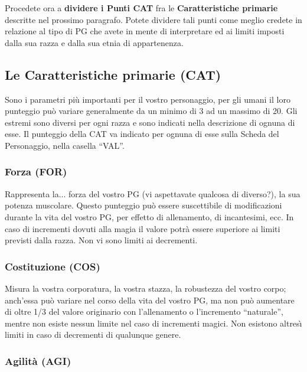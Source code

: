 Procedete ora a \textbf{dividere i Punti CAT} fra le
\textbf{Caratteristiche primarie} descritte nel prossimo paragrafo.
Potete dividere tali punti come meglio credete in relazione al tipo di
PG che avete in mente di interpretare ed ai limiti imposti dalla sua
razza e dalla sua etnia di appartenenza.

{\raggedright \subsection{Le Caratteristiche primarie (CAT)}}

Sono i parametri pi\`u importanti per il vostro personaggio, per gli
umani il loro punteggio pu\`o variare generalmente da un minimo di 3
ad un massimo di 20. Gli estremi sono diversi per ogni razza e sono
indicati nella descrizione di ognuna di esse.  Il punteggio della CAT
va indicato per ognuna di esse sulla Scheda del Personaggio, nella
casella ``VAL''.

\subsubsection{Forza (FOR)}

Rappresenta la... forza del vostro PG (vi aspettavate qualcosa di
diverso?), la sua potenza muscolare.  Questo punteggio pu\`o essere
suscettibile di modificazioni durante la vita del vostro PG, per
effetto di allenamento, di incantesimi, ecc. 
In caso di incrementi dovuti alla magia il valore potr\`a essere
superiore ai limiti previsti dalla razza. Non vi sono limiti ai
decrementi.


\subsubsection{Costituzione (COS)}

Misura la vostra corporatura, la vostra stazza, la robustezza del
vostro corpo; anch'essa pu\`o variare nel corso della vita del
vostro PG, ma non pu\`o aumentare di oltre 1/3 del valore originario
con l'allenamento o l'incremento ``naturale'', mentre non esiste nessun
limite nel caso di incrementi magici. Non esistono altres\`{\i} limiti
in caso di decrementi di qualunque genere.

\subsubsection{Agilit\`a (AGI)}

